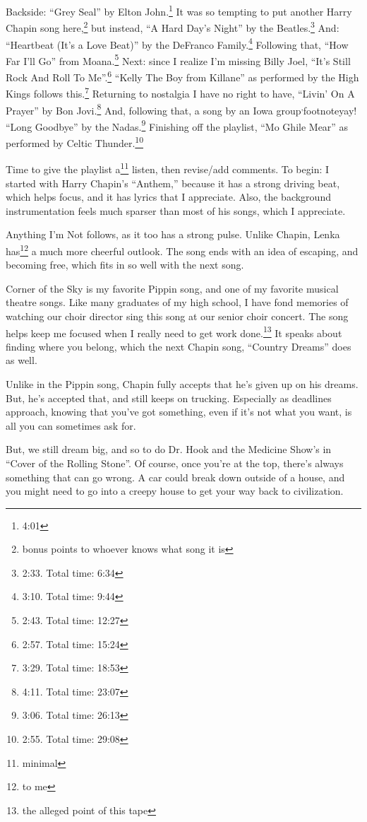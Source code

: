 \documentclass[12pt]{article}[titlepage]
\newcommand{\say}[1]{``#1''}
\newcommand{\1}{\={a}}
\newcommand{\2}{\={e}}
\newcommand{\3}{\={\i}}
\newcommand{\4}{\=o}
\newcommand{\5}{\=u}
\newcommand{\6}{\={A}}
\renewcommand{\,}{\textsuperscript{,}}
\begin{document}
Backside:
\say{Grey Seal} by Elton John.\footnote{4:01}
It was so tempting to put another Harry Chapin song here,\footnote{bonus points to whoever knows what song it is} but instead, \say{A Hard Day's Night} by the Beatles.\footnote{2:33. Total time: 6:34}
And: \say{Heartbeat (It's a Love Beat)} by the DeFranco Family.\footnote{3:10. Total time: 9:44}
Following that, \say{How Far I'll Go} from Moana.\footnote{2:43. Total time: 12:27}
Next: since I realize I'm missing Billy Joel, \say{It's Still Rock And Roll To Me}.\footnote{2:57. Total time: 15:24}
\say{Kelly The Boy from Killane} as performed by the High Kings follows this.\footnote{3:29. Total time: 18:53}
Returning to nostalgia I have no right to have, \say{Livin' On A Prayer} by Bon Jovi.\footnote{4:11. Total time: 23:07}
And, following that, a song by an Iowa group\,footnote{yay!} \say{Long Goodbye} by the Nadas.\footnote{3:06. Total time: 26:13}
Finishing off the playlist, \say{Mo Ghile Mear} as performed by Celtic Thunder.\footnote{2:55. Total time: 29:08}

Time to give the playlist a\footnote{minimal} listen, then revise/add comments.
To begin: I started with Harry Chapin's \say{Anthem,} because it has a strong driving beat, which helps focus, and it has lyrics that I appreciate.
Also, the background instrumentation feels much sparser than most of his songs, which I appreciate.

Anything I'm Not follows, as it too has a strong pulse.
Unlike Chapin, Lenka has\footnote{to me} a much more cheerful outlook.
The song ends with an idea of escaping, and becoming free, which fits in so well with the next song.

Corner of the Sky is my favorite Pippin song, and one of my favorite musical theatre songs.
Like many graduates of my high school, I have fond memories of watching our choir director sing this song at our senior choir concert.
The song helps keep me focused when I really need to get work done.\footnote{the alleged point of this tape}
It speaks about finding where you belong, which the next Chapin song, \say{Country Dreams} does as well.

Unlike in the Pippin song, Chapin fully accepts that he's given up on his dreams.
But, he's accepted that, and still keeps on trucking.
Especially as deadlines approach, knowing that you've got something, even if it's not what you want, is all you can sometimes ask for.

But, we still dream big, and so to do Dr. Hook and the Medicine Show's in \say{Cover of the Rolling Stone}.
Of course, once you're at the top, there's always something that can go wrong.
A car could break down outside of a house, and you might need to go into a creepy house to get your way back to civilization.
\end{document}
